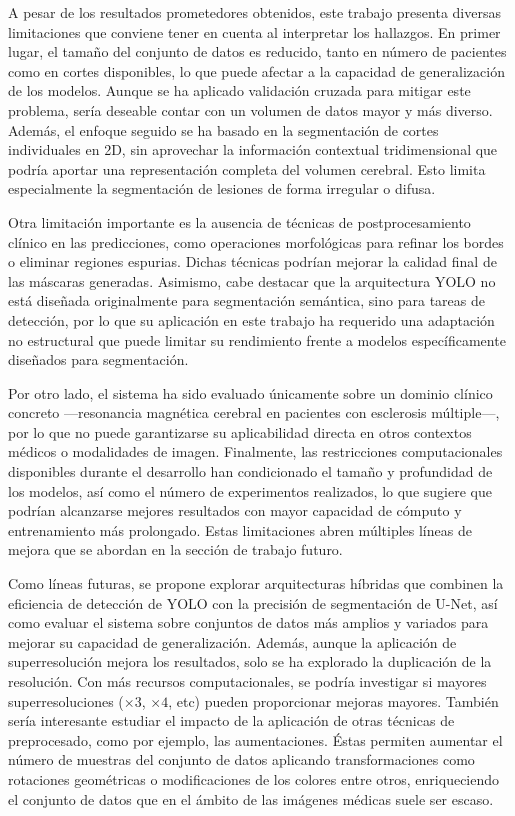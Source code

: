 \documentclass[../main.tex]{subfiles}
\begin{document}
A pesar de los resultados prometedores obtenidos, este trabajo presenta diversas limitaciones que conviene tener en cuenta al interpretar los hallazgos. En primer lugar, el tamaño del conjunto de datos es reducido, tanto en número de pacientes como en cortes disponibles, lo que puede afectar a la capacidad de generalización de los modelos. Aunque se ha aplicado validación cruzada para mitigar este problema, sería deseable contar con un volumen de datos mayor y más diverso. Además, el enfoque seguido se ha basado en la segmentación de cortes individuales en 2D, sin aprovechar la información contextual tridimensional que podría aportar una representación completa del volumen cerebral. Esto limita especialmente la segmentación de lesiones de forma irregular o difusa.

Otra limitación importante es la ausencia de técnicas de postprocesamiento clínico en las predicciones, como operaciones morfológicas para refinar los bordes o eliminar regiones espurias. Dichas técnicas podrían mejorar la calidad final de las máscaras generadas. Asimismo, cabe destacar que la arquitectura YOLO no está diseñada originalmente para segmentación semántica, sino para tareas de detección, por lo que su aplicación en este trabajo ha requerido una adaptación no estructural que puede limitar su rendimiento frente a modelos específicamente diseñados para segmentación.

Por otro lado, el sistema ha sido evaluado únicamente sobre un dominio clínico concreto —resonancia magnética cerebral en pacientes con esclerosis múltiple—, por lo que no puede garantizarse su aplicabilidad directa en otros contextos médicos o modalidades de imagen. Finalmente, las restricciones computacionales disponibles durante el desarrollo han condicionado el tamaño y profundidad de los modelos, así como el número de experimentos realizados, lo que sugiere que podrían alcanzarse mejores resultados con mayor capacidad de cómputo y entrenamiento más prolongado. Estas limitaciones abren múltiples líneas de mejora que se abordan en la sección de trabajo futuro.

Como líneas futuras, se propone explorar arquitecturas híbridas que combinen la eficiencia de detección de YOLO con la precisión de segmentación de U-Net, así como evaluar el sistema sobre conjuntos de datos más amplios y variados para mejorar su capacidad de generalización. Además, aunque la aplicación de superresolución mejora los resultados, solo se ha explorado la duplicación de la resolución. Con más recursos computacionales, se podría investigar si mayores superresoluciones ($\times 3$, $\times 4$, etc) pueden proporcionar mejoras mayores. También sería interesante estudiar el impacto de la aplicación de otras técnicas de preprocesado, como por ejemplo, las aumentaciones. Éstas permiten aumentar el número de muestras del conjunto de datos aplicando transformaciones como rotaciones geométricas o modificaciones de los colores entre otros, enriqueciendo el conjunto de datos que en el ámbito de las imágenes médicas suele ser escaso. 
\end{document}
